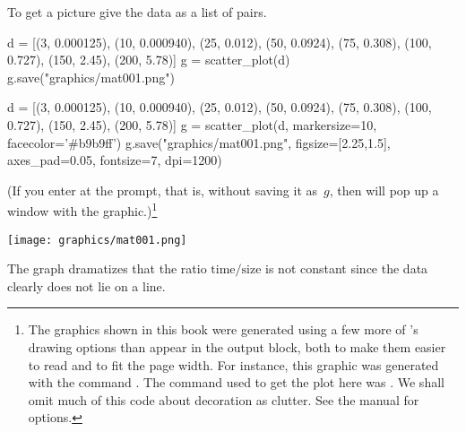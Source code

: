 To get a picture give \Sage{} the data as a list of pairs.
\begin{sageoutput}
d = [(3, 0.000125), (10, 0.000940), (25, 0.012),  
     (50, 0.0924), (75, 0.308), (100, 0.727), 
     (150, 2.45), (200, 5.78)]
g = scatter_plot(d)  
g.save("graphics/mat001.png")            
\end{sageoutput}
\begin{sagesilent}
d = [(3, 0.000125), (10, 0.000940), (25, 0.012),  
     (50, 0.0924), (75, 0.308), (100, 0.727), 
     (150, 2.45), (200, 5.78)]
g = scatter_plot(d, markersize=10, facecolor='#b9b9ff')
g.save("graphics/mat001.png", figsize=[2.25,1.5], axes_pad=0.05, fontsize=7, dpi=1200)              
\end{sagesilent}
\noindent
(If you enter  at the prompt, that is, 
without saving it as~$g$, then \Sage{} will pop up a window with the
graphic.)\footnote{The graphics shown in this book were generated using a few 
more of \protect\Sage's drawing options than appear in the output block,
both to make them easier to read and to fit the page width.
For instance, this graphic was generated with the command
\protect{}.
The \protect\Sage{} command used to get the plot here was 
\protect{}.
We shall omit much of this code about decoration as clutter.
See the \protect\Sage{} manual for \protect{} options.}
\begin{center}
  \texttt{[image: graphics/mat001.png]}
\end{center}
The graph dramatizes that the ratio $\text{time}/\text{size}$
is not constant
since the data clearly does not lie on a line.

